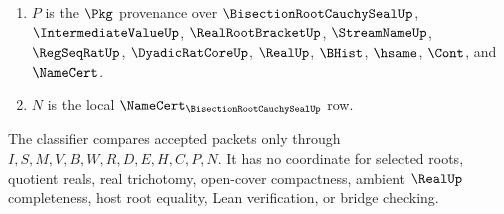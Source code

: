 \begin{definition}
\begin{enumerate}
\item $P$ is the $\Pkg$ provenance over $\BisectionRootCauchySealUp$, $\IntermediateValueUp$, $\RealRootBracketUp$, $\StreamNameUp$, $\RegSeqRatUp$, $\DyadicRatCoreUp$, $\RealUp$, $\BHist$, $\hsame$, $\Cont$, and $\NameCert$.
\item $N$ is the local $\NameCert_{\BisectionRootCauchySealUp}$ row.
\end{enumerate}
The classifier compares accepted packets only through $I,S,M,V,B,W,R,D,E,H,C,P,N$. It has no coordinate for selected roots, quotient reals, real trichotomy, open-cover compactness, ambient $\RealUp$ completeness, host root equality, Lean verification, or bridge checking.
\end{definition}

